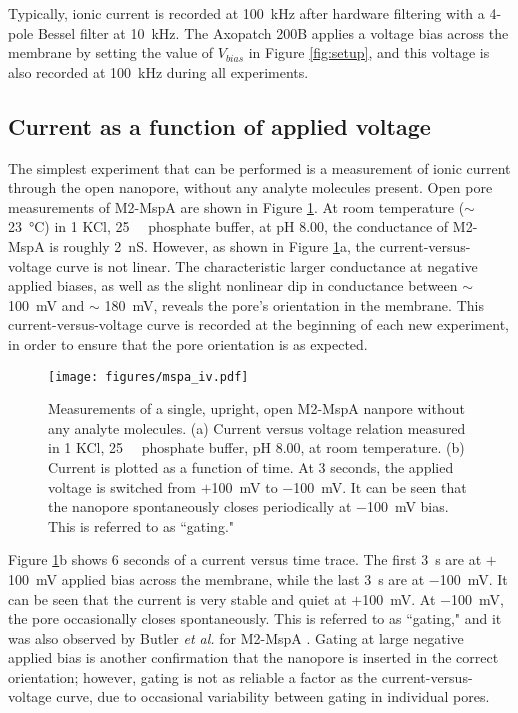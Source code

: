 Typically, ionic current is recorded at \SI{100}{\kHz} after hardware filtering with a 4-pole Bessel filter at \SI{10}{\kHz}.  The Axopatch 200B applies a voltage bias across the membrane by setting the value of $V_{bias}$ in Figure \ref{fig:setup}, and this voltage is also recorded at \SI{100}{\kHz} during all experiments.

\subsection{Current as a function of applied voltage}
\label{pore_orientation}

The simplest experiment that can be performed is a measurement of ionic current through the open nanopore, without any analyte molecules present.  Open pore measurements of M2-MspA are shown in Figure \ref{fig:iv_mspa}.  At room temperature ($\sim$ \SI{23}{\degreeCelsius}) in \SI{1}{\Molar} KCl, \SI{25}{\milli\Molar} phosphate buffer, at pH \num{8.00}, the conductance of M2-MspA is roughly \SI{2}{\nano\siemens}.  However, as shown in Figure \ref{fig:iv_mspa}a, the current-versus-voltage curve is not linear.  The characteristic larger conductance at negative applied biases, as well as the slight nonlinear dip in conductance between $\sim$ \SI{100}{\mV} and $\sim$ \SI{180}{\mV}, reveals the pore's orientation in the membrane.  This current-versus-voltage curve is recorded at the beginning of each new experiment, in order to ensure that the pore orientation is as expected.

\begin{figure}[h]
\begin{centering}
\texttt{[image: figures/mspa\_iv.pdf]}
\caption[MspA current versus voltage]{Measurements of a single, upright, open M2-MspA nanpore without any analyte molecules.  (a) Current versus voltage relation measured in \SI{1}{\Molar} KCl, \SI{25}{\milli\Molar} phosphate buffer, pH \num{8.00}, at room temperature.  (b) Current is plotted as a function of time.  At \num{3} seconds, the applied voltage is switched from $+$\SI{100}{\milli\volt} to \SI{-100}{\milli\volt}.  It can be seen that the nanopore spontaneously closes periodically at \SI{-100}{\milli\volt} bias.  This is referred to as ``gating."}
\label{fig:iv_mspa}
\end{centering}
\end{figure}

Figure \ref{fig:iv_mspa}b shows \num{6} seconds of a current versus time trace.  The first \SI{3}{\s} are at $+$\SI{100}{\mV} applied bias across the membrane, while the last \SI{3}{\s} are at $-$\SI{100}{\mV}.  It can be seen that the current is very stable and quiet at $+$\SI{100}{\mV}.  At $-$\SI{100}{\mV}, the pore occasionally closes spontaneously.  This is referred to as ``gating," and it was also observed by Butler \textit{et al.} for M2-MspA \citep{Butler2008}.  Gating at large negative applied bias is another confirmation that the nanopore is inserted in the correct orientation; however, gating is not as reliable a factor as the current-versus-voltage curve, due to occasional variability between gating in individual pores.


